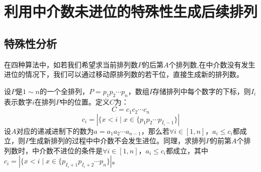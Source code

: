 \documentclass[10pt, twocolumn]{ctexart}
\begin{document}
\section{ 利用中介数未进位的特殊性生成后续排列 }
\subsection{特殊性分析}
在四种算法中，如若我们希望求当前排列数$P$的后第$A$个排列数,在中介数没有发生进位的情况下，我们可以通过移动原排列数的若干位，直接生成新的排列数。

设$P$是$1\sim n$的一个全排列，$P=p_1p_2\cdots p_n$，数组$I$存储排列中每个数字的下标，则$I_{i}$表示数字$i$在排列$P$中的位置。定义$C$为：
\begin{displaymath}
C=c_1c_2\cdots c_n
\end{displaymath}
\begin{equation}
c_i=|\{x < i\mid x\in\{p_1p_2\cdots p_{I_i-1}\}|
\end{equation}
设$A$对应的递减进制下的数为$a=a_1a_2\cdots a_{n-1}$，那么若$\forall i\in[1,n]$，$a_i \leq c_i$都成立，则$P$生成新排列的过程中中介数不会发生进位。同理，求排列$P$的前第$A$个排列数时，中介数不进位的条件是$\forall i\in[1,n]$，$a_i\leq c_i$都成立，其中$c_i=|\{x < i\mid x\in\{p_{I_i+1}p_{I_i+2}\cdots p_n\}|$。
\end{document}
